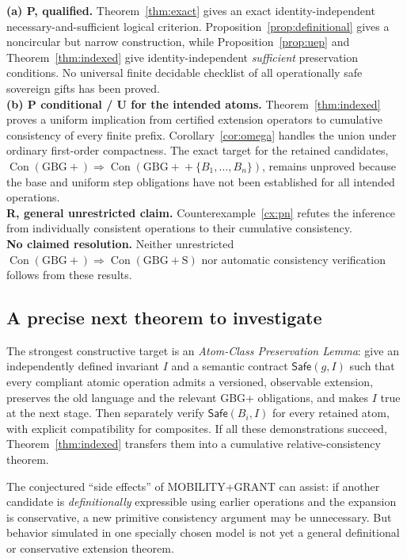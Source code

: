 \documentclass[11pt,letterpaper]{article}
\theoremstyle{definition}
\newcommand{\Con}{\operatorname{Con}}
\newcommand{\Gb}{\mathrm{GBG+}}
\newcommand{\GG}{\mathrm{GBG+S}}
\begin{document}
\begin{tcolorbox}[colback=gray!6,colframe=gray!45,boxrule=0.5pt,arc=1mm,title={\bfseries Settlement record}]
\textbf{(a) P, qualified.} Theorem~\ref{thm:exact} gives an exact identity-independent necessary-and-sufficient logical criterion. Proposition~\ref{prop:definitional} gives a noncircular but narrow construction, while Proposition~\ref{prop:uep} and Theorem~\ref{thm:indexed} give identity-independent \emph{sufficient} preservation conditions. No universal finite decidable checklist of all operationally safe sovereign gifts has been proved.\\[5pt]
\textbf{(b) P conditional / U for the intended atoms.} Theorem~\ref{thm:indexed} proves a uniform implication from certified extension operators to cumulative consistency of every finite prefix. Corollary~\ref{cor:omega} handles the union under ordinary first-order compactness. The exact target for the retained candidates, \(\Con(\Gb)\Rightarrow\Con(\Gb+\{B_1,\ldots,B_n\})\), remains unproved because the base and uniform step obligations have not been established for all intended operations.\\[5pt]
\textbf{R, general unrestricted claim.} Counterexample~\ref{cx:pn} refutes the inference from individually consistent operations to their cumulative consistency.\\[5pt]
\textbf{No claimed resolution.} Neither unrestricted \(\Con(\Gb)\Rightarrow\Con(\GG)\) nor automatic consistency verification follows from these results.
\end{tcolorbox}

\subsection{A precise next theorem to investigate}

The strongest constructive target is an \emph{Atom-Class Preservation Lemma}: give an independently defined invariant \(I\) and a semantic contract \(\mathsf{Safe}(g,I)\) such that every compliant atomic operation admits a versioned, observable extension, preserves the old language and the relevant GBG+ obligations, and makes \(I\) true at the next stage. Then separately verify \(\mathsf{Safe}(B_i,I)\) for every retained atom, with explicit compatibility for composites. If all these demonstrations succeed, Theorem~\ref{thm:indexed} transfers them into a cumulative relative-consistency theorem.

The conjectured ``side effects'' of MOBILITY+GRANT can assist: if another candidate is \emph{definitionally} expressible using earlier operations and the expansion is conservative, a new primitive consistency argument may be unnecessary. But behavior simulated in one specially chosen model is not yet a general definitional or conservative extension theorem.
\end{document}

